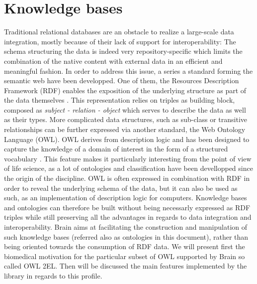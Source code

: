 \documentclass{bioinfo}
\begin{document}
\section{Knowledge bases}
Traditional relational databases are an obstacle to realize a large-scale data integration, mostly because of their lack of support for 
interoperability: The schema structuring the data is indeed very repository-specific which limits the combination of the 
native content with external data in an efficient and meaningful fashion. In order to address this issue, 
a series a standard forming the semantic web have been developped. One of them, the Resources Description 
Framework (RDF) enables the exposition of the underlying structure as part of the data themselves \citep{FrankManola}. This
representation relies on triples as building block, composed as \emph{subject - relation - object} which serves to
describe the data as well as their types. More complicated data structures, such as sub-class or
transitive relationships can be further expressed via another standard, the Web Ontology Language (OWL). OWL derives from description logic and
has been designed to capture the knowledge of a domain of interest in the form of a structured vocabulary \citep{W3COWLWorkingGroup}. 
This feature makes it particularly 
interesting from the point of view of life science, as a lot of ontologies and classification have been devellopped since the origin of 
the discipline. OWL is often expressed in combination with RDF in order to reveal the underlying schema of the data, but 
it can also be used as such, as an implementation of description logic for computers. 
Knowledge bases and ontologies can therefore be built without being necessarly expressed as RDF triples while still preserving all the 
advantages in regards to data integration and interoperability.
Brain aims at facilitating the construction and manipulation of 
such knowledge bases (referred also as ontologies in this document), rather than being oriented towards the consumption of RDF data. 
We will present first the biomedical motivation for the particular subset of OWL supported by Brain so called OWL 2EL. 
Then will be discussed the main features implemented by the library in regards to this profile.
\end{document}
